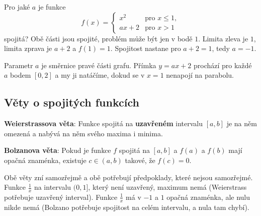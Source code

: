 \begin{example}
  Pro jaké $a$ je funkce
  \begin{equation*}
    f(x) = \begin{cases} x^2 & \text{pro } x\leq 1,\\ ax + 2 & \text{pro } x > 1\end{cases}
  \end{equation*}
  spojitá? Obě části jsou spojité, problém může být jen v bodě $1$. Limita zleva je $1$, limita zprava je $a + 2$ a $f(1) = 1$. Spojitost nastane pro $a + 2 = 1$, tedy $a = -1$.

  \begin{center}
  \end{center}
  Parametr $a$ je směrnice pravé části grafu. Přímka $y = ax + 2$ prochází pro každé $a$ bodem $[0, 2]$ a my ji natáčíme, dokud se v $x = 1$ nenapojí na parabolu.
\end{example}

\subsection{Věty o spojitých funkcích}\label{sec:vety-spojite}

\begin{definitionbox}
  \textbf{Weierstrassova věta}: Funkce spojitá na \textbf{uzavřeném} intervalu $[a, b]$ je na něm omezená a nabývá na něm svého maxima i minima.

  \textbf{Bolzanova věta}: Pokud je funkce $f$ spojitá na $[a, b]$ a $f(a)$ a $f(b)$ mají opačná znaménka, existuje $c\in(a, b)$ takové, že $f(c) = 0$.
\end{definitionbox}

Obě věty zní samozřejmě a obě potřebují předpoklady, které nejsou samozřejmé. Funkce $\frac{1}{x}$ na intervalu $(0, 1]$, který není uzavřený, maximum nemá (Weierstrass potřebuje uzavřený interval). Funkce $\frac{1}{x}$ má v $-1$ a $1$ opačná znaménka, ale nulu nikde nemá (Bolzano potřebuje spojitost na celém intervalu, a nula tam chybí).

